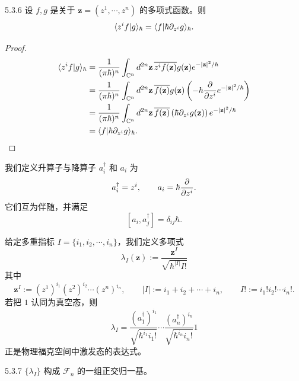 \begin{proposition}{5.3.6}
  设 $f,g$ 是关于 $\mathbf z=(z^1,\cdots,z^n)$ 的多项式函数。则
  \[
  \langle z^if|g\rangle_\hbar=\langle f|\hbar\partial_{z^i}g\rangle_\hbar.
  \]
\end{proposition}

\begin{proof}
  \[
  \begin{aligned}
  \langle z^if|g\rangle_\hbar
  &=\frac{1}{(\pi\hbar)^n}\int_{\mathbb{C}^n}d^{2n}\mathbf z\,
  \overline{z^if(\mathbf z)}g(\mathbf z)e^{-\lvert \mathbf z\rvert^2/\hbar}\\
  &=\frac{1}{(\pi\hbar)^n}\int_{\mathbb{C}^n}d^{2n}\mathbf z\,
  \overline{f(\mathbf z)}g(\mathbf z)\left(-\hbar\frac{\partial}{\partial z^i}
  e^{-\lvert \mathbf z\rvert^2/\hbar}\right)\\
  &=\frac{1}{(\pi\hbar)^n}\int_{\mathbb{C}^n}d^{2n}\mathbf z\,
  \overline{f(\mathbf z)}\left(\hbar\partial_{z^i}g(\mathbf z)\right)
  e^{-\lvert \mathbf z\rvert^2/\hbar}\\
  &=\langle f|\hbar\partial_{z^i}g\rangle_\hbar.
  \end{aligned}
  \]
\end{proof}

我们定义升算子与降算子 $a_i^\dagger$ 和 $a_i$ 为
\[
a_i^\dagger=z^i,\qquad a_i=\hbar\frac{\partial}{\partial z^i}.
\]
它们互为伴随，并满足
\[
[a_i,a_j^\dagger]=\delta_{ij}\hbar.
\]

给定多重指标 $I=\{i_1,i_2,\cdots,i_n\}$，我们定义多项式
\[
\lambda_I(\mathbf z):=\frac{\mathbf z^I}{\sqrt{\hbar^{|I|}I!}}
\]
其中
\[
\mathbf z^I:=(z^1)^{i_1}(z^2)^{i_2}\cdots(z^n)^{i_n},\qquad
|I|:=i_1+i_2+\cdots+i_n,\qquad
I!:=i_1!i_2!\cdots i_n!.
\]
若把 $1$ 认同为真空态，则
\[
\lambda_I=\frac{(a_1^\dagger)^{i_1}}{\sqrt{\hbar^{i_1}i_1!}}
\cdots\frac{(a_n^\dagger)^{i_n}}{\sqrt{\hbar^{i_n}i_n!}}1
\]
正是物理福克空间中激发态的表达式。

\begin{proposition}{5.3.7}
  $\{\lambda_I\}$ 构成 $\mathcal{F}_n$ 的一组正交归一基。
\end{proposition}

